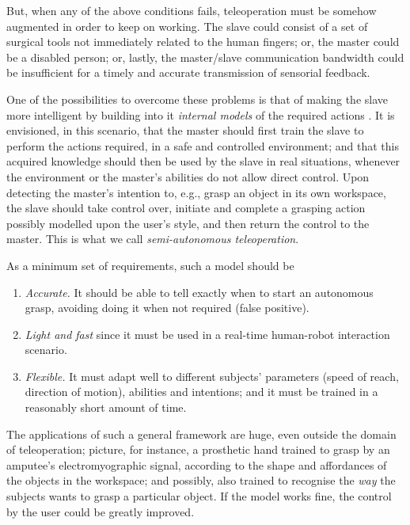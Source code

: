 \documentclass[a4paper,10pt,conference]{ieeeconf}
\begin{document}
But, when any of the above conditions fails, teleoperation must be
somehow augmented in order to keep on working. The slave could consist
of a set of surgical tools \cite{okamura} not immediately related to
the human fingers; or, the master could be a disabled person; or,
lastly, the master/slave communication bandwidth could be insufficient
for a timely and accurate transmission of sensorial feedback.

One of the possibilities to overcome these problems is that of making
the slave more intelligent by building into it \emph{internal models}
of the required actions \cite{kawato-99}. It is envisioned, in this
scenario, that the master should first train the slave to perform the
actions required, in a safe and controlled environment; and that this
acquired knowledge should then be used by the slave in real
situations, whenever the environment or the master's abilities do not
allow direct control. Upon detecting the master's intention to, e.g.,
grasp an object in its own workspace, the slave should take control
over, initiate and complete a grasping action possibly modelled upon
the user's style, and then return the control to the master. This is
what we call \emph{semi-autonomous teleoperation}.

As a minimum set of requirements, such a model should be

\begin{enumerate}

  \item \emph{Accurate.} It should be able to tell exactly when to
    start an autonomous grasp, avoiding doing it when not required
    (false positive).

  \item \emph{Light and fast} since it must be used in a real-time
    human-robot interaction scenario.

  \item \emph{Flexible.} It must adapt well to different subjects'
    parameters (speed of reach, direction of motion), abilities and
    intentions; and it must be trained in a reasonably short amount of
    time.

\end{enumerate}

The applications of such a general framework are huge, even outside
the domain of teleoperation; picture, for instance, a prosthetic hand
trained to grasp by an amputee's electromyographic signal, according
to the shape and affordances of the objects in the workspace; and
possibly, also trained to recognise the \emph{way} the subjects wants
to grasp a particular object. If the model works fine, the control by
the user could be greatly improved.
\end{document}
